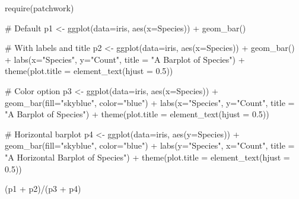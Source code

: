 \documentclass[
  letterpaper,
  DIV=11,
  numbers=noendperiod]{scrreprt}
\newenvironment{Shaded}{\begin{snugshade}}{\end{snugshade}}
\newcommand{\AttributeTok}[1]{\textcolor[rgb]{0.40,0.45,0.13}{#1}}
\newcommand{\CommentTok}[1]{\textcolor[rgb]{0.37,0.37,0.37}{#1}}
\newcommand{\FloatTok}[1]{\textcolor[rgb]{0.68,0.00,0.00}{#1}}
\newcommand{\FunctionTok}[1]{\textcolor[rgb]{0.28,0.35,0.67}{#1}}
\newcommand{\NormalTok}[1]{\textcolor[rgb]{0.00,0.23,0.31}{#1}}
\newcommand{\OtherTok}[1]{\textcolor[rgb]{0.00,0.23,0.31}{#1}}
\newcommand{\SpecialCharTok}[1]{\textcolor[rgb]{0.37,0.37,0.37}{#1}}
\newcommand{\StringTok}[1]{\textcolor[rgb]{0.13,0.47,0.30}{#1}}
\begin{document}
\begin{Shaded}
\begin{Highlighting}[]
\FunctionTok{require}\NormalTok{(patchwork)}

\CommentTok{\# Default}
\NormalTok{p1 }\OtherTok{\textless{}{-}} \FunctionTok{ggplot}\NormalTok{(}\AttributeTok{data=}\NormalTok{iris, }\FunctionTok{aes}\NormalTok{(}\AttributeTok{x=}\NormalTok{Species)) }\SpecialCharTok{+}
        \FunctionTok{geom\_bar}\NormalTok{()}

\CommentTok{\# With labels and title}
\NormalTok{p2 }\OtherTok{\textless{}{-}} \FunctionTok{ggplot}\NormalTok{(}\AttributeTok{data=}\NormalTok{iris, }\FunctionTok{aes}\NormalTok{(}\AttributeTok{x=}\NormalTok{Species)) }\SpecialCharTok{+}
        \FunctionTok{geom\_bar}\NormalTok{() }\SpecialCharTok{+}
        \FunctionTok{labs}\NormalTok{(}\AttributeTok{x=}\StringTok{"Species"}\NormalTok{, }\AttributeTok{y=}\StringTok{"Count"}\NormalTok{, }\AttributeTok{title =} \StringTok{"A Barplot of Species"}\NormalTok{) }\SpecialCharTok{+}
        \FunctionTok{theme}\NormalTok{(}\AttributeTok{plot.title =} \FunctionTok{element\_text}\NormalTok{(}\AttributeTok{hjust =} \FloatTok{0.5}\NormalTok{))}

\CommentTok{\# Color option}
\NormalTok{p3 }\OtherTok{\textless{}{-}} \FunctionTok{ggplot}\NormalTok{(}\AttributeTok{data=}\NormalTok{iris, }\FunctionTok{aes}\NormalTok{(}\AttributeTok{x=}\NormalTok{Species)) }\SpecialCharTok{+}
        \FunctionTok{geom\_bar}\NormalTok{(}\AttributeTok{fill=}\StringTok{"skyblue"}\NormalTok{, }\AttributeTok{color=}\StringTok{"blue"}\NormalTok{) }\SpecialCharTok{+}
        \FunctionTok{labs}\NormalTok{(}\AttributeTok{x=}\StringTok{"Species"}\NormalTok{, }\AttributeTok{y=}\StringTok{"Count"}\NormalTok{, }\AttributeTok{title =} \StringTok{"A Barplot of Species"}\NormalTok{) }\SpecialCharTok{+}
        \FunctionTok{theme}\NormalTok{(}\AttributeTok{plot.title =} \FunctionTok{element\_text}\NormalTok{(}\AttributeTok{hjust =} \FloatTok{0.5}\NormalTok{))}

\CommentTok{\# Horizontal barplot}
\NormalTok{p4 }\OtherTok{\textless{}{-}} \FunctionTok{ggplot}\NormalTok{(}\AttributeTok{data=}\NormalTok{iris, }\FunctionTok{aes}\NormalTok{(}\AttributeTok{y=}\NormalTok{Species)) }\SpecialCharTok{+}
        \FunctionTok{geom\_bar}\NormalTok{(}\AttributeTok{fill=}\StringTok{"skyblue"}\NormalTok{, }\AttributeTok{color=}\StringTok{"blue"}\NormalTok{) }\SpecialCharTok{+}
        \FunctionTok{labs}\NormalTok{(}\AttributeTok{y=}\StringTok{"Species"}\NormalTok{, }\AttributeTok{x=}\StringTok{"Count"}\NormalTok{, }\AttributeTok{title =} \StringTok{"A Horizontal Barplot of Species"}\NormalTok{) }\SpecialCharTok{+}
        \FunctionTok{theme}\NormalTok{(}\AttributeTok{plot.title =} \FunctionTok{element\_text}\NormalTok{(}\AttributeTok{hjust =} \FloatTok{0.5}\NormalTok{))}

\NormalTok{(p1 }\SpecialCharTok{+}\NormalTok{ p2)}\SpecialCharTok{/}\NormalTok{(p3 }\SpecialCharTok{+}\NormalTok{ p4)}
\end{Highlighting}
\end{Shaded}
\end{document}
